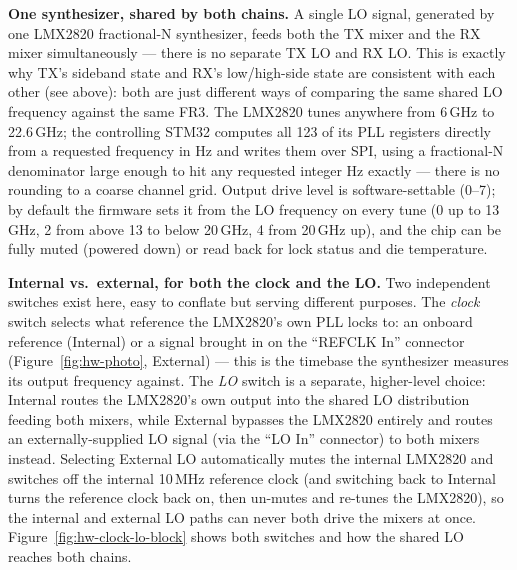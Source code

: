 \textbf{One synthesizer, shared by both chains.} A single LO signal, generated by one LMX2820 fractional-N
synthesizer, feeds both the TX mixer and the RX mixer simultaneously --- there is no separate TX LO and RX LO.
This is exactly why TX's sideband state and RX's low/high-side state are consistent with each other (see above):
both are just different ways of comparing the same shared LO frequency against the same FR3. The LMX2820 tunes
anywhere from 6\,GHz to 22.6\,GHz; the controlling STM32 computes all 123 of its PLL registers directly from a
requested frequency in Hz and writes them over SPI, using a fractional-N denominator large enough to hit any
requested integer Hz exactly --- there is no rounding to a coarse channel grid. Output drive level is
software-settable (0--7); by default the firmware sets it from the LO frequency on every tune (0 up to 13\,GHz, 2 from
above 13 to below 20\,GHz, 4 from 20\,GHz up), and the chip can be fully muted (powered down) or read back for lock status and die
temperature.

\textbf{Internal vs.\ external, for both the clock and the LO.} Two independent switches exist here, easy to
conflate but serving different purposes. The \emph{clock} switch selects what reference the LMX2820's own PLL
locks to: an onboard reference (Internal) or a signal brought in on the ``REFCLK In'' connector
(Figure~\ref{fig:hw-photo}, External) --- this is the timebase the synthesizer measures its output frequency
against. The \emph{LO} switch is a separate, higher-level choice: Internal routes the LMX2820's own output into
the shared LO distribution feeding both mixers, while External bypasses the LMX2820 entirely and routes an
externally-supplied LO signal (via the ``LO In'' connector)
to both mixers instead. Selecting External LO automatically mutes the internal LMX2820 and switches off the internal 10\,MHz
reference clock (and switching back to Internal turns the reference clock back on, then un-mutes and re-tunes
the LMX2820), so the internal and external LO paths can never both drive the mixers at once. Figure~\ref{fig:hw-clock-lo-block} shows both switches and how the shared LO reaches both chains.

